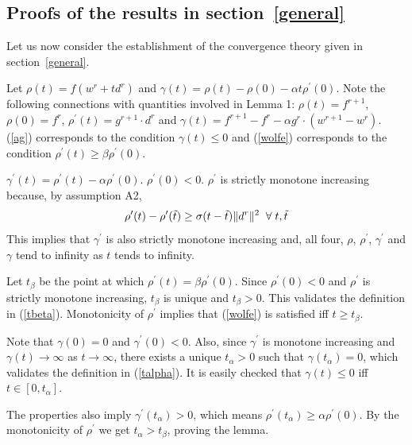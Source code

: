 \documentclass[twoside, 11pt]{article}
\begin{document}
\subsection*{Proofs of the results in section~\ref{general}}

Let us now consider the establishment of the convergence theory given in section~\ref{general}.

\vspace*{0.1in}

Let $\rho(t)=f(w^r+td^r)$ and $\gamma(t)=\rho(t)-\rho(0)-\alpha t\rho^\prime(0)$.
Note the following connections with quantities involved in Lemma 1: $\rho(t)=f^{r+1}$, $\rho(0)=f^r$, $\rho^\prime(t)=g^{r+1}\cdot d^r$ and $\gamma(t)=f^{r+1} - f^r - \alpha g^r\cdot(w^{r+1}-w^r)$.
(\ref{ag}) corresponds to the condition $\gamma(t)\le 0$ and (\ref{wolfe}) corresponds to the condition $\rho^\prime(t)\ge \beta\rho^\prime(0)$.

$\gamma^\prime(t) = \rho^\prime(t)-\alpha \rho^\prime(0)$.
$\rho^\prime(0)<0$.
$\rho^\prime$ is strictly monotone increasing because, by assumption A2,
\begin{equation}
\rho^\prime(t)-\rho^\prime(\tilde{t}) \ge \sigma (t-\tilde{t})\|d^r\|^2 \;\; \forall \; t, \tilde{t}
\label{prop11}
\end{equation}
This implies that $\gamma^\prime$ is also strictly monotone increasing and, all four, $\rho$, $\rho^\prime$, $\gamma^\prime$ and $\gamma$ tend to infinity as $t$ tends to infinity.

Let $t_\beta$ be the point at which $\rho^\prime(t)=\beta\rho^\prime(0)$. Since $\rho^\prime(0)<0$ and $\rho^\prime$ is strictly monotone increasing, $t_\beta$ is unique and $t_\beta>0$. This validates the definition in (\ref{tbeta}). Monotonicity of $\rho^\prime$ implies that (\ref{wolfe}) is satisfied iff $t\ge t_\beta$.

Note that $\gamma(0)=0$ and $\gamma^\prime(0)<0$. Also, since $\gamma^\prime$ is monotone increasing and $\gamma(t)\to\infty$ as $t\to\infty$, there exists a unique $t_\alpha>0$ such that $\gamma(t_\alpha)=0$, which validates the definition in (\ref{talpha}). It is easily checked that $\gamma(t)\le 0$ iff $t\in [0,t_\alpha]$.

The properties also imply $\gamma^\prime(t_\alpha)> 0$, which means $\rho^\prime(t_\alpha) \ge \alpha\rho^\prime(0)$. By the monotonicity of $\rho^\prime$ we get $t_\alpha>t_\beta$, proving the lemma.

\vspace*{0.1in}
\end{document}
